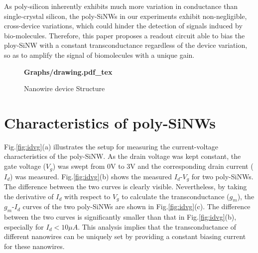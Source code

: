 \documentclass{article}
\begin{document}
As poly-silicon inherently exhibits much more variation in conductance than single-crystal silicon,
the poly-SiNWs in our experiments exhibit non-negligible, cross-device variations,
which could hinder the detection of signals induced by bio-molecules.
Therefore, this paper proposes a readout circuit able to bias the ploy-SiNW with a constant
transconductance regardless of the device variation,
so as to amplify the signal of biomolecules with a unique gain.

\begin{figure}
    \centering
    {\selectfont\textbf{
        \def\svgwidth{5.0cm}
        \fontsize{6}{7}\selectfont
         {Graphs/drawing.pdf_tex}
    }}
    \caption{Nanowire device Structure}
    \label{fig:draw}
\end{figure}

\section{Characteristics of poly-SiNWs}
Fig.\ref{fig:idvg}(a) illustrates the setup for measuring the current-voltage characteristics of the poly-SiNW.
As the drain voltage was kept constant,
the gate voltage ($V_g$) was swept from 0V to 3V and the corresponding drain current ($I_{d}$) was measured.
Fig.\ref{fig:idvg}(b) shows the measured $I_d$-$V_g$ for two poly-SiNWs.
The difference between the two curves is clearly visible.
Nevertheless, by taking the derivative of $I_d$ with respect to $V_g$ to calculate the transconductance ($g_m$),
the $g_m$-$I_d$ curves of the two poly-SiNWs are shown in Fig.\ref{fig:idvg}(c).
The difference between the two curves is significantly smaller than that in Fig.\ref{fig:idvg}(b),
especially for $I_d < 10\mu A$.
This analysis implies that the transconductance of different nanowires can be uniquely set by
providing a constant biasing current for these nanowires.
\end{document}
